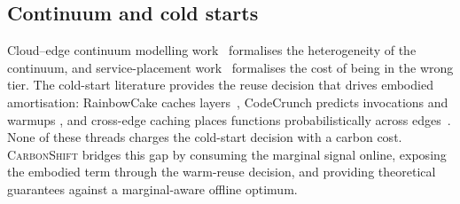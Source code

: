 \subsection{Continuum and cold starts}
Cloud--edge continuum modelling work~\cite{patel2024modeling,aldulaimy2024computing} formalises the heterogeneity of the continuum, and service-placement work~\cite{rac2024costaware,soumplis2024performance} formalises the cost of being in the wrong tier. The cold-start literature provides the reuse decision that drives embodied amortisation: RainbowCake caches layers~\cite{yu2024rainbowcake}, CodeCrunch predicts invocations and warmups \cite{roy2024codecrunch}, and cross-edge caching places functions probabilistically across edges~\cite{chen2024crossedge}. None of these threads charges the cold-start decision with a carbon cost. \textsc{CarbonShift} bridges this gap by consuming the marginal signal online, exposing the embodied term through the warm-reuse decision, and providing theoretical guarantees against a marginal-aware offline optimum.
